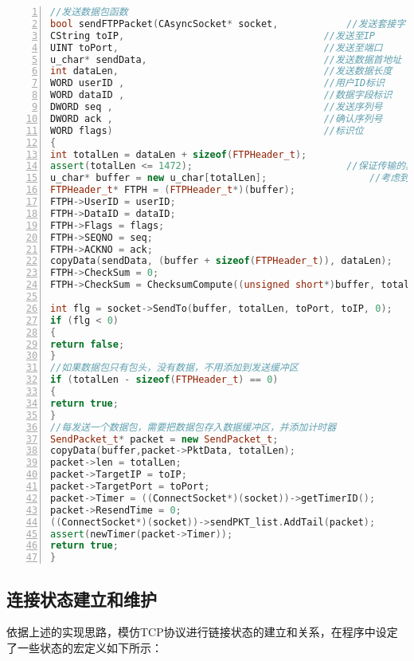 \documentclass[lang=cn,11pt]{elegantpaper}
\begin{document}
\begin{lstlisting}[language = C++, numbers=left, 
numberstyle=\tiny,keywordstyle=\color{blue!70},
commentstyle=\color{red!50!green!50!blue!50},frame=shadowbox,
rulesepcolor=\color{red!20!green!20!blue!20},basicstyle=\ttfamily]
//发送数据包函数
bool sendFTPPacket(CAsyncSocket* socket,			//发送套接字
CString toIP,									//发送至IP
UINT toPort,									//发送至端口
u_char* sendData,								//发送数据首地址
int dataLen,									//发送数据长度
WORD userID ,									//用户ID标识
WORD dataID ,									//数据字段标识
DWORD seq ,										//发送序列号
DWORD ack ,										//确认序列号
WORD flags)										//标识位
{
int totalLen = dataLen + sizeof(FTPHeader_t);
assert(totalLen <= 1472);							//保证传输的其他数据长度小于剩余的传输空间1472 - 16 = 1456字节
u_char* buffer = new u_char[totalLen];					//考虑到MTU的大小，将UDP发送数据的最大大小限制在1472字节以内
FTPHeader_t* FTPH = (FTPHeader_t*)(buffer);
FTPH->UserID = userID;
FTPH->DataID = dataID;
FTPH->Flags = flags;
FTPH->SEQNO = seq;
FTPH->ACKNO = ack;
copyData(sendData, (buffer + sizeof(FTPHeader_t)), dataLen);	//复制数据到发送缓冲中
FTPH->CheckSum = 0;												//先将校验和置位0
FTPH->CheckSum = ChecksumCompute((unsigned short*)buffer, totalLen);

int flg = socket->SendTo(buffer, totalLen, toPort, toIP, 0);	//发送数据报
if (flg < 0)
{
return false;
}
//如果数据包只有包头，没有数据，不用添加到发送缓冲区
if (totalLen - sizeof(FTPHeader_t) == 0)
{
return true;
}
//每发送一个数据包，需要把数据包存入数据缓冲区，并添加计时器
SendPacket_t* packet = new SendPacket_t;
copyData(buffer,packet->PktData, totalLen);
packet->len = totalLen;
packet->TargetIP = toIP;
packet->TargetPort = toPort;
packet->Timer = ((ConnectSocket*)(socket))->getTimerID();
packet->ResendTime = 0;												//重发次数初始化为0
((ConnectSocket*)(socket))->sendPKT_list.AddTail(packet);			//加入缓冲区	
assert(newTimer(packet->Timer));									//添加计时器
return true;
}

\end{lstlisting}


\subsection{连接状态建立和维护}

依据上述的实现思路，模仿TCP协议进行链接状态的建立和关系，在程序中设定了一些状态的宏定义如下所示：
\end{document}

